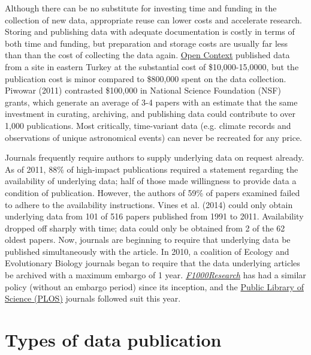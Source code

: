 \documentclass[10pt,twocolumn]{article}
\begin{document}
Although there can be no substitute for investing time and funding in the collection of new data, appropriate reuse can lower costs and accelerate research. 
Storing and publishing data with adequate documentation is costly in terms of both time and funding, but preparation and storage costs are usually far less than than the cost of collecting the data again.
\href{http://opencontext.org/}{Open Context} published data from a site in eastern Turkey at the substantial cost of \$10,000-15,0000, but the publication cost is minor compared to \$800,000 spent on the data collection.\cite{kansa_we_2014}
Piwowar (2011) contrasted \$100,000 in National Science Foundation (NSF) grants, which generate an average of 3-4 papers with an estimate that the same investment in curating, archiving, and publishing data could contribute to over 1,000 publications.\cite{piwowar_data_2011}
Most critically, time-variant data (e.g. climate records and observations of unique astronomical events) can never be recreated for any price.\cite{gray_online_2002}

Journals frequently require authors to supply underlying data on request already.
As of 2011, 88\% of high-impact publications required a statement regarding the availability of underlying data; half of those made willingness to provide data a condition of publication.\cite{alsheikh-ali_public_2011}
However, the authors of 59\% of papers examined failed to adhere to the availability instructions.
Vines et al. (2014)\cite{vines_availability_2014} could only obtain underlying data from 101 of 516 papers published from 1991 to 2011.
Availability dropped off sharply with time; data could only be obtained from 2 of the 62 oldest papers.
Now, journals are beginning to require that underlying data be published simultaneously with the article.
In 2010, a coalition of Ecology and Evolutionary Biology journals began to require that the data underlying articles be archived with a maximum embargo of 1 year.\cite{whitlock_data_2010, fairbairn_advent_2010}
\href{http://f1000research.com}{\emph{F1000Research}} has had a similar policy (without an embargo period) since its inception, and the {\href{http://www.plos.org/}{Public Library of Science (PLOS)}} journals followed suit this year.\cite{bloom_data_2014}

\section*{Types of data publication}\label{types-of-data-publication}
\end{document}
